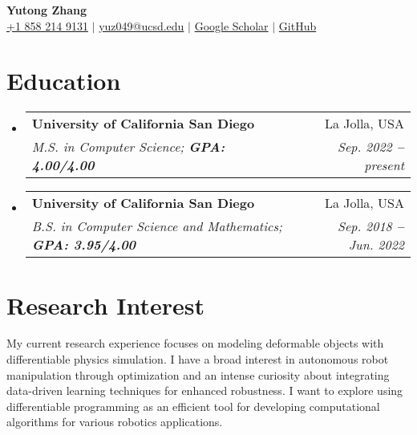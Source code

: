 \documentclass[letterpaper,11pt]{article}
\makeatletter
\newcommand{\resumeEducationHeading}[4]{
    \vspace{-2pt}\item
    \begin{tabular*}{0.97\textwidth}[t]{l@{\extracolsep{\fill}}r}
        \textbf{#1} & #2 \\
        \textit{\small #3} & \textit{\small #4}
    \end{tabular*}\vspace{-7pt}
}
\newcommand{\resumeSubHeadingListStart}{\begin{itemize}[leftmargin=0in, label={}]}
\newcommand{\resumeSubHeadingListEnd}{\end{itemize}}
\makeatother
\begin{document}

\begin{center}
    \textbf{\Huge Yutong Zhang} \\ \vspace{3pt}
    \small
    \faMobile \hspace{.5pt} \href{tel:18582149131}{+1 858 214 9131}
    $|$
    \faEnvelope \hspace{.5pt} \href{mailto:yuz049@ucsd.edu}{yuz049@ucsd.edu}
    $|$
    \faGraduationCap \hspace{.5pt} \href{https://scholar.google.com/citations?user=wuaUYbYAAAAJ&hI}{Google Scholar}
    $|$
    \faGithub \hspace{.5pt} \href{https://github.com/TonyZYT2000}{GitHub}
\end{center}




\section{Education}
    \vspace{3pt}
    \resumeSubHeadingListStart
        \resumeEducationHeading
            {University of California San Diego}
            {La Jolla, USA}
            {M.S. in Computer Science; \textbf{GPA: 4.00/4.00}}
            {Sep. 2022 \textbf{--} present}
        \resumeEducationHeading
            {University of California San Diego}
            {La Jolla, USA}
            {B.S. in Computer Science and Mathematics; \textbf{GPA: 3.95/4.00}}
            {Sep. 2018 \textbf{--} Jun. 2022}
    \resumeSubHeadingListEnd



\section{Research Interest}
    \vspace{3pt}
    My current research experience focuses on modeling deformable objects with differentiable physics simulation.
    I have a broad interest in autonomous robot manipulation through optimization and an intense curiosity about integrating data-driven learning techniques for enhanced robustness.
    I want to explore using differentiable programming as an efficient tool for developing computational algorithms for various robotics applications.
\end{document}

